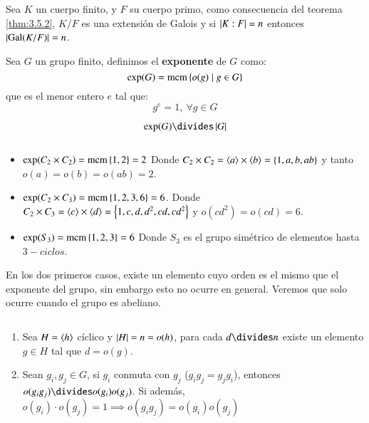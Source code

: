 \begin{obs}
    Sea $K$ un cuerpo finito, y $F$ su cuerpo primo, como consecuencia del teorema \ref{thm:3.5.2}, $K/F$ es una extensión de Galois y si $\left|K:F\right| = n$ entonces $\left|\mathrm{Gal}(K/F)\right| = n$.
\end{obs}


\begin{dfn}
    Sea $G$ un grupo finito, definimos el \textbf{exponente} de $G$ como:
    $$
        \mathrm{exp}(G) = \mathrm{mcm}\left\{o(g) \mid g \in G\right\}
    $$
    que es el menor entero $e$ tal que:
    $$
        g^e = 1,\ \forall g \in G
    $$
\end{dfn}
\begin{obs}
    $$
        \mathrm{exp}(G) \divides \vabs{G}
    $$
\end{obs}

\begin{eg}$ $
    \begin{itemize}
        \item $\mathrm{exp}(C_2 \times C_2) = \mathrm{mcm}\left\{1, 2\right\} = 2$
        Donde $C_2 \times C_2 = \langle a\rangle \times \langle b\rangle = \left\{1, a, b, ab\right\}$ y tanto $o(a) = o(b) = o(ab) = 2$.
        \item $\mathrm{exp}(C_2 \times C_3) = \mathrm{mcm}\left\{1, 2, 3, 6\right\} = 6$.
        Donde $C_2 \times C_3 = \langle c\rangle \times \langle d\rangle = \left\{1, c, d, d^2, cd, cd^2\right\}$ y $o(cd^2) = o(cd) = 6$.
        \item $\mathrm{exp}(S_3) = \mathrm{mcm}\left\{1, 2, 3\right\} = 6$
        Donde $S_3$ es el grupo simétrico de elementos hasta $3-ciclos$.
    \end{itemize}
    En los dos primeros casos, existe un elemento cuyo orden es el mismo que el exponente del grupo, sin embargo esto no ocurre en general. Veremos que solo ocurre cuando el grupo es abeliano.
\end{eg}

\begin{lm}\label{lm:orden-conmut}$ $
    \begin{enumerate}
        \item Sea $H = \langle h\rangle$ cíclico y $\left|H\right| = n = o(h)$, para cada $d \divides n$ existe un elemento $g \in H$ tal que $d = o(g)$.
        \item Sean $g_i, g_j \in G$, si $g_i$ conmuta con $g_j$ ($g_ig_j = g_jg_i$), entonces $o(g_ig_j) \divides o(g_i) o(g_j)$. Si además, $o(g_i) \cdot o(g_j) = 1 \implies o(g_ig_j) = o(g_i) o(g_j)$
    \end{enumerate}
\end{lm}

